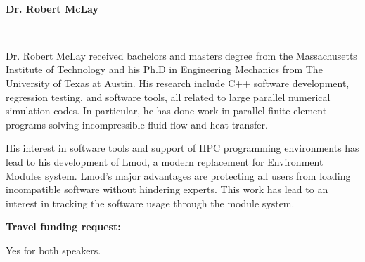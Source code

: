 \documentclass[12pt]{article}
\begin{document}
~~

\noindent
{\bf{}Dr. Robert McLay}

~~

\noindent
Dr. Robert McLay received bachelors and masters degree from the Massachusetts 
Institute of Technology and his Ph.D in Engineering Mechanics from The University 
of Texas at Austin.  His research include C++ software development, regression 
testing, and software tools, all related to large parallel numerical simulation codes.  
In particular, he has done work in parallel finite-element programs solving 
incompressible fluid flow and heat transfer.

His interest in software tools and support of HPC programming environments has 
lead to his development of Lmod, a modern replacement for Environment Modules 
system.  Lmod's major advantages are protecting all users from loading incompatible 
software without hindering experts.  This work has lead to an interest in tracking the 
software usage through the module system.

\noindent
{\bf{}Travel funding request:}

Yes for both speakers.
\end{document}
